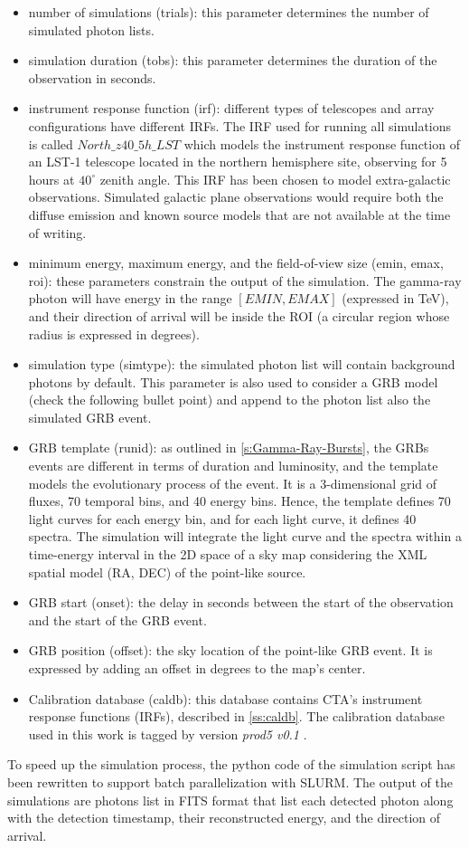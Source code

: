 \begin{itemize}
    \item number of simulations (trials): this parameter determines the number of simulated photon lists.
    \item simulation duration (tobs): this parameter determines the duration of the observation in seconds.
    \item instrument response function (irf): different types of telescopes and array configurations have different IRFs. The IRF used for running all simulations is called $North\_z40\_5h\_LST$ which models the instrument response function of an LST-1 telescope located in the northern hemisphere site, observing for 5 hours at $40^{\circ}$ zenith angle. This IRF has been chosen to model extra-galactic observations. Simulated galactic plane observations would require both the diffuse emission and known source models that are not available at the time of writing.
    \item minimum energy, maximum energy, and the field-of-view size (emin, emax, roi): these parameters constrain the output of the simulation. The gamma-ray photon will have energy in the range $[EMIN, EMAX]$ (expressed in TeV), and their direction of arrival will be inside the ROI (a circular region whose radius is expressed in degrees).
    \item simulation type (simtype): the simulated photon list will contain background photons by default. This parameter is also used to consider a GRB model (check the following bullet point) and append to the photon list also the simulated GRB event. 
    \item GRB template (runid): as outlined in \autoref{s:Gamma-Ray-Bursts}, the GRBs events are different in terms of duration and luminosity, and the template models the evolutionary process of the event. It is a 3-dimensional grid of fluxes, 70 temporal bins, and 40 energy bins. Hence, the template defines 70 light curves for each energy bin, and for each light curve, it defines 40 spectra. The simulation will integrate the light curve and the spectra within a time-energy interval in the 2D space of a sky map considering the XML spatial model (RA, DEC) of the point-like source.
    \item GRB start (onset): the delay in seconds between the start of the observation and the start of the GRB event.
    \item GRB position (offset): the sky location of the point-like GRB event. It is expressed by adding an offset in degrees to the map's center.
    \item Calibration database (caldb): this database contains CTA's instrument response functions (IRFs), described in \autoref{ss:caldb}. The calibration database used in this work is tagged by version \textit{prod5 v0.1} \cite{zenodo_2021}.
\end{itemize}
To speed up the simulation process, the python code of the simulation script has been rewritten to support batch parallelization with SLURM. The output of the simulations are photons list in FITS format \cite{fitswebsite} that list  each detected photon along with the detection timestamp, their reconstructed energy, and the direction of arrival.

